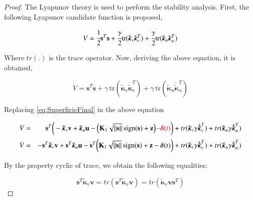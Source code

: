 \documentclass[sn-mathphys-num]{sn-jnl}
\DeclareMathOperator{\sign}{sign}
\theoremstyle{thmstyleone}%
\theoremstyle{thmstyletwo}%
\theoremstyle{thmstylethree}%
\begin{document}
\begin{proof}
The Lyapunov theory is used to perform the stability analysis. First, the following Lyapunov candidate function is proposed,

\begin{equation*}\label{eq:CandidataLyapunov}
    V = \cfrac{1}{2}\mathbf{s}^T\mathbf{s} + \cfrac{\gamma}{2}\mathrm{tr}(\boldsymbol{\tilde{\kappa}}_v \boldsymbol{\tilde{\kappa}}_v^T)+ \cfrac{\gamma}{2}\mathrm{tr}(\boldsymbol{\tilde{\kappa}}_u \boldsymbol{\tilde{\kappa}}_u^T) 
\end{equation*}

Where $tr(.)$ is the trace operator. Now, deriving the above equation, it is obtained,

\begin{equation}
    \dot{V} = \mathbf{s}^T\dot{\mathbf{s}} +\gamma\,\mathrm{tr}(\boldsymbol{\tilde{\kappa}}_v\boldsymbol{\dot{\tilde{\kappa}}}_v^T)+ \gamma\,\mathrm{tr}(\boldsymbol{\tilde{\kappa}}_u \boldsymbol{\dot{\tilde{\kappa}}}_u^T)
\end{equation}

Replacing \eqref{eq:SuperficieFinal} in the above equation

\begin{eqnarray}
   \nonumber \dot{V} &=& \mathbf{s}^T \bigg( -\boldsymbol{\tilde{\kappa}}_v\mathbf{v}+\boldsymbol{\tilde{\kappa}}_u\mathbf{u}  
     -\Big( \mathbf{K}_1\sqrt{||\mathbf{s}||}\sign(\mathbf{s}) +\mathbf{z} \Big) \textcolor{red}{- \boldsymbol{\delta}(t)} \bigg)+tr(\boldsymbol{\tilde{\kappa}}_v\gamma\boldsymbol{\dot{\tilde{\kappa}}}_v^T)+ tr (\boldsymbol{\tilde{\kappa}}_u\gamma \boldsymbol{\dot{\tilde{\kappa}}}_u^T)\nonumber\\
    \dot{V} &=&  -\mathbf{s}^T\boldsymbol{\tilde{\kappa}}_v\mathbf{v}+\mathbf{s}^T\boldsymbol{\tilde{\kappa}}_u\mathbf{u} - \mathbf{s}^T \bigg(\mathbf{K}_1\sqrt{||\mathbf{s}||}\sign(\mathbf{s}) +\mathbf{z}
     -\boldsymbol{\delta}(t)  \bigg)+tr(\boldsymbol{\tilde{\kappa}}_v\gamma\boldsymbol{\dot{\tilde{\kappa}}}_v^T)+ tr (\boldsymbol{\tilde{\kappa}}_u\gamma \boldsymbol{\dot{\tilde{\kappa}}}_u^T)
\end{eqnarray}

By the property cyclic of trace, we obtain the following equalities:

\begin{equation}
 \mathbf{s}^T \boldsymbol{\tilde{\kappa}}_v\mathbf{v} =tr (\mathbf{s}^T \boldsymbol{\tilde{\kappa}}_v\mathbf{v})=tr( \boldsymbol{\tilde{\kappa}}_v\mathbf{v}\mathbf{s}^T)
\end{equation}


\end{proof}
\end{document}
